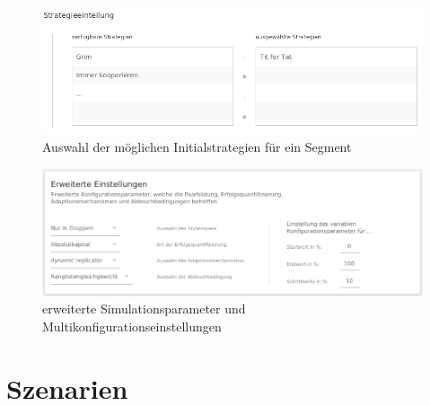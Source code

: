 \documentclass[parskip=full,11pt]{scrartcl}
\begin{document}
\begin{figure}[hb]
	\centering
	\includegraphics[width=\textwidth]{images/konfig_strat.png}
	\caption{\label{fig:konfig_strat}
		Auswahl der möglichen Initialstrategien für ein Segment}
\end{figure}

\begin{figure}[hb]
	\centering
	\includegraphics[width=\textwidth]{images/konfig_adv.png}
	\caption{\label{fig:konfig_adv}
		erweiterte Simulationsparameter und Multikonfigurationseinstellungen}
\end{figure}

\newpage

\section{Szenarien}
\end{document}
